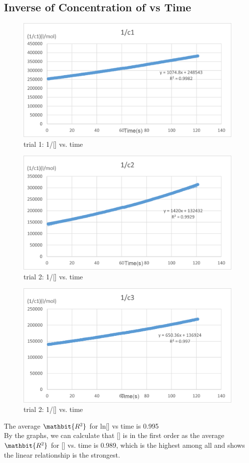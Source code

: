 \documentclass{article}
\begin{document}
\subsection{Inverse of Concentration of  vs Time}
\begin{figure}[H] 
\centering
\includegraphics[scale=0.9]{1.png}
\caption{trial 1: 1/[] vs. time}
\end{figure}
\begin{figure}[H] 
\centering
\includegraphics[scale=0.9]{2.png}
\caption{trial 2: 1/[] vs. time}
\end{figure}
\begin{figure}[H] 
\centering
\includegraphics[scale=0.9]{3.png}
\caption{trial 2: 1/[] vs. time}
\end{figure}
The average $\mathbit{R^2}$ for ln[] vs time is 0.995\\
By the graphs, we can calculate that [] is in the first order as the average $\mathbit{R^2}$ for [] vs. time is 0.989, which is the highest among all and shows the linear relationship is the strongest.
\end{document}
